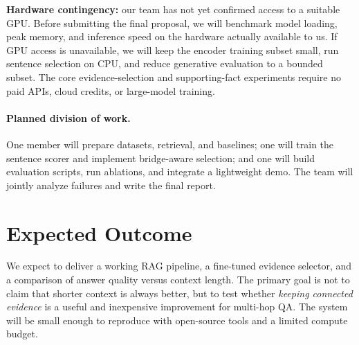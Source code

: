 \documentclass[11pt]{article}
\begin{document}
\textbf{Hardware contingency:} our team has not yet confirmed access to a suitable GPU. Before submitting the final proposal, we will benchmark model loading, peak memory, and inference speed on the hardware actually available to us. If GPU access is unavailable, we will keep the encoder training subset small, run sentence selection on CPU, and reduce generative evaluation to a bounded subset. The core evidence-selection and supporting-fact experiments require no paid APIs, cloud credits, or large-model training.

\paragraph{Planned division of work.} One member will prepare datasets, retrieval, and baselines; one will train the sentence scorer and implement bridge-aware selection; and one will build evaluation scripts, run ablations, and integrate a lightweight demo. The team will jointly analyze failures and write the final report.

\section{Expected Outcome}

We expect to deliver a working RAG pipeline, a fine-tuned evidence selector, and a comparison of answer quality versus context length. The primary goal is not to claim that shorter context is always better, but to test whether \emph{keeping connected evidence} is a useful and inexpensive improvement for multi-hop QA. The system will be small enough to reproduce with open-source tools and a limited compute budget.



\end{document}
